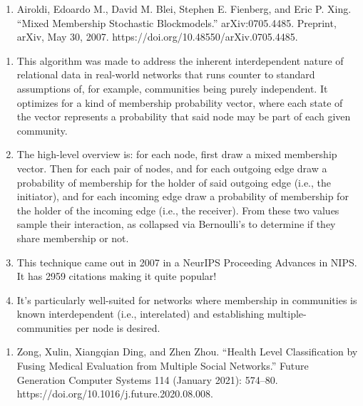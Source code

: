 \documentclass[11pt]{article}
\providecommand{\tightlist}{%
      \setlength{\itemsep}{0pt}\setlength{\parskip}{0pt}}
\begin{document}
\begin{enumerate}
\def\labelenumi{\arabic{enumi}.}
\setcounter{enumi}{3}
\tightlist
\item
  Airoldi, Edoardo M., David M. Blei, Stephen E. Fienberg, and Eric P.
  Xing. ``Mixed Membership Stochastic Blockmodels.'' arXiv:0705.4485.
  Preprint, arXiv, May 30, 2007.
  https://doi.org/10.48550/arXiv.0705.4485.
\end{enumerate}

\begin{enumerate}
\def\labelenumi{(\alph{enumi})}
\tightlist
\item
  This algorithm was made to address the inherent interdependent nature
  of relational data in real-world networks that runs counter to
  standard assumptions of, for example, communities being purely
  independent. It optimizes for a kind of membership probability vector,
  where each state of the vector represents a probability that said node
  may be part of each given community.
\item
  The high-level overview is: for each node, first draw a mixed
  membership vector. Then for each pair of nodes, and for each outgoing
  edge draw a probability of membership for the holder of said outgoing
  edge (i.e., the initiator), and for each incoming edge draw a
  probability of membership for the holder of the incoming edge (i.e.,
  the receiver). From these two values sample their interaction, as
  collapsed via Bernoulli's to determine if they share membership or
  not.
\item
  This technique came out in 2007 in a NeurIPS Proceeding Advances in
  NIPS. It has 2959 citations making it quite popular!
\item
  It's particularly well-suited for networks where membership in
  communities is known interdependent (i.e., interelated) and
  establishing multiple-communities per node is desired.
\end{enumerate}

\begin{enumerate}
\def\labelenumi{\arabic{enumi}.}
\setcounter{enumi}{4}
\tightlist
\item
  Zong, Xulin, Xiangqian Ding, and Zhen Zhou. ``Health Level
  Classification by Fusing Medical Evaluation from Multiple Social
  Networks.'' Future Generation Computer Systems 114 (January 2021):
  574--80. https://doi.org/10.1016/j.future.2020.08.008.
\end{enumerate}
\end{document}

